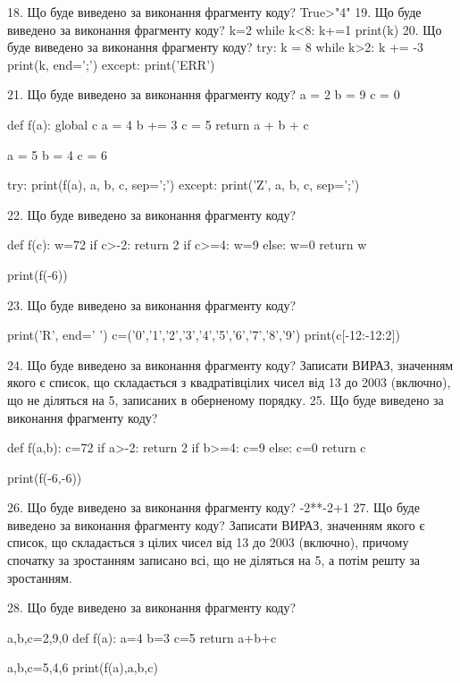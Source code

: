 \documentclass[11pt]{article}
\begin{document}
18. Що буде виведено за виконання фрагменту коду?
True>"4"
19. Що буде виведено за виконання фрагменту коду?
k=2
   while k<8: k+=1
   print(k)
20. Що буде виведено за виконання фрагменту коду?
try:
    k = 8
    while k>2:
        k += -3
    print(k, end=';')
except:
    print('ERR')

21. Що буде виведено за виконання фрагменту коду?
a = 2
b = 9
c = 0

def f(a):
global c    a = 4
    b += 3
    c = 5
    return a + b + c

a = 5
b = 4
c = 6

try:
    print(f(a), a, b, c, sep=';')
except:
    print('Z', a, b, c, sep=';')

22. Що буде виведено за виконання фрагменту коду?

def f(c):
    w=72
    if c>-2: 
        return 2
    if c>=4:
         w=9
    else:
         w=0
    return w

print(f(-6))

23. Що буде виведено за виконання фрагменту коду?

print('R', end=' ')
c=('0','1','2','3','4','5','6','7','8','9')
print(c[-12:-12:2])


24. Що буде виведено за виконання фрагменту коду?
Записати ВИРАЗ, значенням якого є список, що складається з квадратівцілих чисел від 13 до 2003 (включно), що не діляться на 5, записаних в оберненому порядку.
25. Що буде виведено за виконання фрагменту коду?

def f(a,b):
    c=72
    if a>-2:
        return 2
    if b>=4:
         c=9
    else: 
        c=0
    return c

print(f(-6,-6))

26. Що буде виведено за виконання фрагменту коду?
-2**-2+1
27. Що буде виведено за виконання фрагменту коду?
Записати ВИРАЗ, значенням якого є список, що складається з цілих чисел від 13 до 2003 (включно), причому спочатку за зростанням записано всі, що не діляться на 5, а потім решту за зростанням.

28. Що буде виведено за виконання фрагменту коду?

a,b,c=2,9,0
def f(a):
    a=4
    b=3
    c=5
    return a+b+c

a,b,c=5,4,6
print(f(a),a,b,c)
\end{document}
